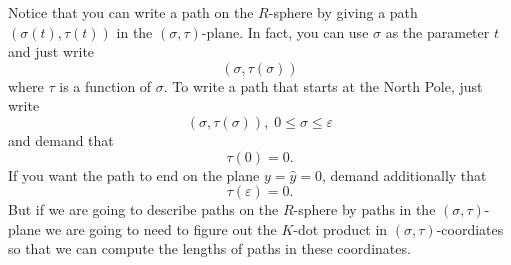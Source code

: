 \documentclass{article}%
\begin{document}
Notice that you can write a path on the $R$-sphere by giving a path $\left(
\sigma\left(  t\right)  ,\tau\left(  t\right)  \right)  $ in the $\left(
\sigma,\tau\right)  $-plane. In fact, you can use $\sigma$ as the parameter
$t$ and just write
\begin{equation}
\left(  \sigma,\tau\left(  \sigma\right)  \right)  \label{62}%
\end{equation}
where $\tau$ is a function of $\sigma$. To write a path that starts at the
North Pole, just write%
\[
\left(  \sigma,\tau\left(  \sigma\right)  \right)  ,\;0\leq\sigma
\leq\varepsilon
\]
and demand that%
\[
\tau\left(  0\right)  =0.
\]
If you want the path to end on the plane $y=\hat{y}=0$, demand additionally
that%
\[
\tau\left(  \varepsilon\right)  =0.
\]
But if we are going to describe paths on the $R$-sphere by paths in the
$\left(  \sigma,\tau\right)  $-plane we are going to need to figure out the
$K$-dot product in $\left(  \sigma,\tau\right)  $-coordiates so that we can
compute the lengths of paths in these coordinates.
\end{document}
